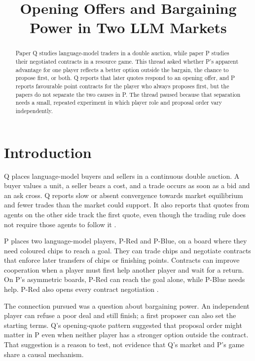 \documentclass{article}
\title{Opening Offers and Bargaining Power in Two LLM Markets}
\begin{document}
\maketitle

\begin{abstract}
Paper Q studies language-model traders in a double auction, while paper P studies their negotiated contracts
in a resource game. This thread asked whether P's apparent advantage for one player reflects a better option
outside the bargain, the chance to propose first, or both. Q reports that later quotes respond to an opening
offer, and P reports favourable point contracts for the player who always proposes first, but the papers do
not separate the two causes in P. The thread paused because that separation needs a small, repeated experiment
in which player role and proposal order vary independently.
\end{abstract}

\section{Introduction}

Q places language-model buyers and sellers in a continuous double auction. A buyer values a unit, a seller
bears a cost, and a trade occurs as soon as a bid and an ask cross. Q reports slow or absent convergence
towards market equilibrium and fewer trades than the market could support. It also reports that quotes from
agents on the other side track the first quote, even though the trading rule does not require those agents to
follow it \cite{Q}.

P places two language-model players, P-Red and P-Blue, on a board where they need coloured chips to reach a
goal. They can trade chips and negotiate contracts that enforce later transfers of chips or finishing points.
Contracts can improve cooperation when a player must first help another player and wait for a return. On P's
asymmetric boards, P-Red can reach the goal alone, while P-Blue needs help. P-Red also opens every contract
negotiation \cite{P}.

The connection pursued was a question about bargaining power. An independent player can refuse a poor deal and
still finish; a first proposer can also set the starting terms. Q's opening-quote pattern suggested that
proposal order might matter in P even when neither player has a stronger option outside the contract. That
suggestion is a reason to test, not evidence that Q's market and P's game share a causal mechanism.
\end{document}
